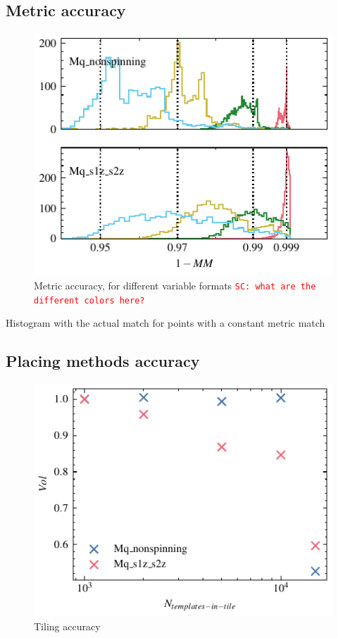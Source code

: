 \documentclass[twocolumn,showpacs,preprintnumbers,nofootinbib,prd,
superscriptaddress,10pt]{revtex4-1}
\newcommand{\sarah}[1]{{\textcolor{red}{\texttt{SC: #1}} }}
\begin{document}
\subsection{Metric accuracy} \label{sec:metric_accuracy}

\begin{figure}[h]
	\includegraphics{metric_accuracy}
	\caption{Metric accuracy, for different variable formats \sarah{what are the different colors here?}}
	\label{fig:metric_accuracy}
\end{figure}

Histogram with the actual match for points with a constant metric match

\subsection{Placing methods accuracy} \label{sec:placing_accuracy}

\begin{figure}[h]
	\includegraphics{tiling_accuracy_test}
	\caption{Tiling accuracy}
	\label{fig:tiling_accuracy}
\end{figure}
\end{document}
